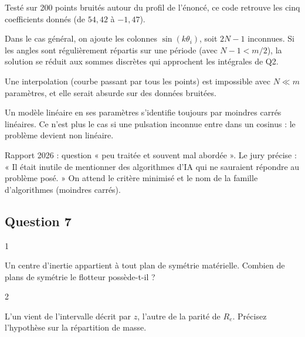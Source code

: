 \documentclass[11pt,a4paper]{article}
\begin{document}
Testé sur 200 points bruités autour du profil de l'énoncé, ce code retrouve les cinq coefficients donnés (de \(54{,}42\) à \(-1{,}47\)).

Dans le cas général, on ajoute les colonnes \(\sin(k\theta_i)\), soit \(2N-1\) inconnues. Si les angles sont régulièrement répartis sur une période (avec \(N-1<m/2\)), la solution se réduit aux sommes discrètes qui approchent les intégrales de Q2.

\begin{piege}

Une interpolation (courbe passant par tous les points) est impossible avec \(N\ll m\) paramètres, et elle serait absurde sur des données bruitées.

\end{piege}

\begin{methode}

Un modèle linéaire en ses paramètres s'identifie toujours par moindres carrés linéaires. Ce n'est plus le cas si une pulsation inconnue entre dans un cosinus : le problème devient non linéaire.

\end{methode}

\begin{jury}

Rapport 2026 : question « peu traitée et souvent mal abordée ». Le jury précise : « Il était inutile de mentionner des algorithmes d'IA qui ne sauraient répondre au problème posé. » On attend le critère minimisé et le nom de la famille d'algorithmes (moindres carrés).

\end{jury}

\hypertarget{question-7}{%
\subsection{Question 7}\label{question-7}}

\begin{indication}{1}

Un centre d'inertie appartient à tout plan de symétrie matérielle. Combien de plans de symétrie le flotteur possède-t-il ?

\end{indication}

\begin{indication}{2}

L'un vient de l'intervalle décrit par \(z\), l'autre de la parité de \(R_e\). Précisez l'hypothèse sur la répartition de masse.

\end{indication}
\end{document}
